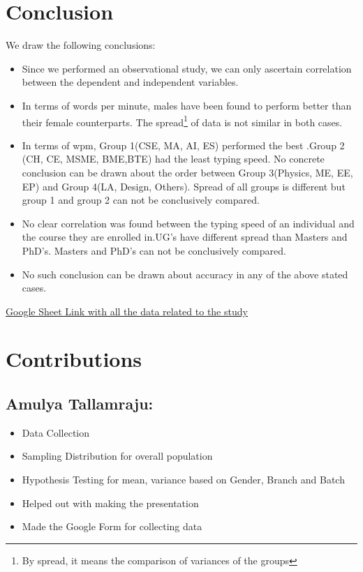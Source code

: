 \documentclass[12pt,a4paper]{report}
\begin{document}
\newpage

\section*{\Huge{Conclusion}}
We draw the following conclusions:
\begin{itemize}
    \item Since we performed an observational study, we can only ascertain correlation between the dependent and independent variables.
    \item In terms of words per minute, males have been found to perform better than their female counterparts. The spread\footnote{By spread, it means the comparison of variances of the groups} of data is not similar in both cases.
    \item In terms of wpm, Group 1(CSE, MA, AI, ES) performed the best .Group 2 (CH, CE, MSME, BME,BTE) had the least typing speed. No concrete conclusion can be drawn about the order between Group 3(Physics, ME, EE, EP) and Group 4(LA, Design, Others).
    Spread of all groups is different but group 1 and group 2 can not be conclusively compared.
    \item No clear correlation was found between the typing speed of an individual and the course they are enrolled in.UG's have different spread than Masters and PhD's.  Masters and PhD's can not be conclusively compared.
    \item No such conclusion can be drawn about accuracy in any of the above stated cases.
\end{itemize}
\href{https://docs.google.com/spreadsheets/d/1xesjf1nIhxYrOKqsC9ru4PHhpJlf1PWCTVzafvY1Ha4/edit?usp=sharing}{Google Sheet Link with all the data related to the study}
\newpage

\section*{\Huge{Contributions}}
\subsection*{Amulya Tallamraju: }
\begin{itemize}
    \item Data Collection
    \item Sampling Distribution for overall population
    \item Hypothesis Testing for mean, variance based on Gender, Branch and Batch
    \item Helped out with making the presentation
    \item Made the Google Form for collecting data
\end{itemize}
\end{document}
